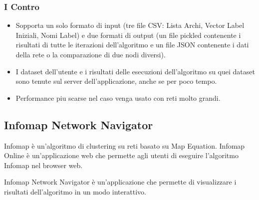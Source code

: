 \documentclass[a4paper,12pt]{report}
\begin{document}
			\subsubsection*{I Contro}
				\begin{itemize}
					\item Sopporta un solo formato di input (tre file CSV: Lista Archi, Vector Label Iniziali, Nomi Label) e due formati di output (un file pickled contenente i risultati di tutte le iterazioni dell'algoritmo e un file JSON contenente i dati della rete o la comparazione di due nodi diversi).
					\item I dataset dell'utente e i risultati delle esecuzioni dell'algoritmo su quei dataset sono tenute sul server dell'applicazione, anche se per poco tempo.
					\item Performance piu scarse nel caso venga usato con reti molto grandi.
				\end{itemize}

		\subsection{Infomap Network Navigator}
		Infomap è un'algoritmo di clustering su reti basato su Map Equation. Infomap Online è un'applicazione web che permette agli utenti di eseguire
		l'algoritmo Infomap nel browser web. \cite{mapequationsite} 
		
		Infomap Network Navigator è un'applicazione che permette di visualizzare i risultati
		dell'algoritmo in un modo interattivo. \cite{mapequationnavigatorsite} 
		
\end{document}
